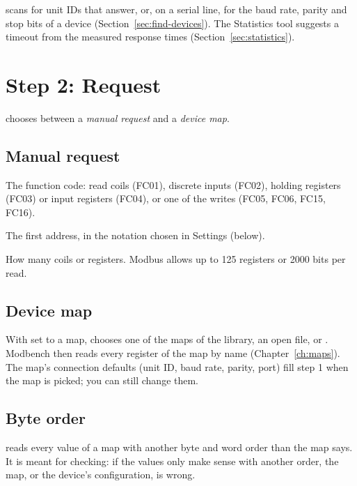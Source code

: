 \begin{tip}
 scans for unit IDs that answer, or, on a serial line, for the baud
rate, parity and stop bits of a device (Section~\ref{sec:find-devices}). The
Statistics tool suggests a timeout from the measured response times
(Section~\ref{sec:statistics}).
\end{tip}

\section{Step 2: Request}

 chooses between a \emph{manual request} and a \emph{device map}.

\subsection{Manual request}

\begin{description}[style=nextline, leftmargin=0pt, font=\intermedium]
  \item[Command] The function code: read coils (FC01), discrete inputs (FC02),
    holding registers (FC03) or input registers (FC04), or one of the writes
    (FC05, FC06, FC15, FC16).
  \item[Start address] The first address, in the notation chosen in Settings
    (below).
  \item[Quantity] How many coils or registers. Modbus allows up to 125
    registers or 2000 bits per read.
\end{description}

\subsection{Device map}

With  set to a map,  chooses one of the maps of the
library, an open file, or . Modbench then reads every
register of the map by name (Chapter~\ref{ch:maps}). The map's connection
defaults (unit ID, baud rate, parity, port) fill step 1 when the map is
picked; you can still change them.

\subsection{Byte order}

 reads every value of a map with another byte and word order
than the map says. It is meant for checking: if the values only make sense
with another order, the map, or the device's configuration, is wrong.

